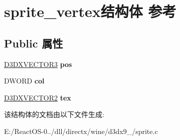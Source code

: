 \hypertarget{structsprite__vertex}{}\section{sprite\+\_\+vertex结构体 参考}
\label{structsprite__vertex}
\subsection*{Public 属性}
\begin{DoxyCompactItemize}
\item 
\mbox{\label{structsprite__vertex_a90c310bc413b28298267099ef3bad54e}} 
\hyperlink{struct___d3_d_v_e_c_t_o_r}{D3\+D\+X\+V\+E\+C\+T\+O\+R3} {\bfseries pos}
\item 
\mbox{\label{structsprite__vertex_a3c3382f61582f59c0a38e8ca0aabbe22}} 
D\+W\+O\+RD {\bfseries col}
\item 
\mbox{\label{structsprite__vertex_ace83726b10c8d24a058eac675de9e771}} 
\hyperlink{struct_d3_d_x_v_e_c_t_o_r2}{D3\+D\+X\+V\+E\+C\+T\+O\+R2} {\bfseries tex}
\end{DoxyCompactItemize}


该结构体的文档由以下文件生成\+:\begin{DoxyCompactItemize}
\item 
E\+:/\+React\+O\+S-\/0../dll/directx/wine/d3dx9\+\_/sprite.\+c\end{DoxyCompactItemize}
